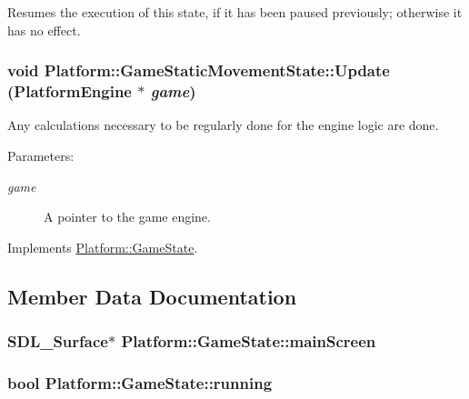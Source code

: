 Resumes the execution of this state, if it has been paused previously; otherwise it has no effect. \hypertarget{class_platform_1_1_game_static_movement_state_07ccc3a9b700867379fae0745451ceff}{
\subsubsection[{Update}]{\setlength{\rightskip}{0pt plus 5cm}void Platform::GameStaticMovementState::Update ({\bf PlatformEngine} $\ast$ {\em game})}}
\label{db/d55/class_platform_1_1_game_static_movement_state_07ccc3a9b700867379fae0745451ceff}


Any calculations necessary to be regularly done for the engine logic are done.

\begin{Desc}
\item[Parameters:]
\begin{description}
\item[{\em game}]A pointer to the game engine. \end{description}
\end{Desc}


Implements \hyperlink{class_platform_1_1_game_state_d39851d7ffd329b2005f1d2c72cf65a2}{Platform::GameState}.

\subsection{Member Data Documentation}
\hypertarget{class_platform_1_1_game_state_12616fd9e6b9620fb0c8228a35aec98a}{
\subsubsection[{mainScreen}]{\setlength{\rightskip}{0pt plus 5cm}SDL\_\-Surface$\ast$ {\bf Platform::GameState::mainScreen}}}
\label{d4/d4f/class_platform_1_1_game_state_12616fd9e6b9620fb0c8228a35aec98a}


\hypertarget{class_platform_1_1_game_state_2e64c5095158f8a2d03d180d701af768}{
\subsubsection[{running}]{\setlength{\rightskip}{0pt plus 5cm}bool {\bf Platform::GameState::running}}}
\label{d4/d4f/class_platform_1_1_game_state_2e64c5095158f8a2d03d180d701af768}


